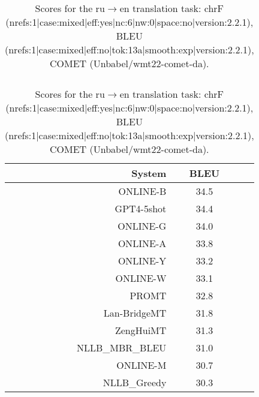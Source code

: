 \documentclass[11pt]{article}
\begin{document}
\begin{table}
\begin{subtable}[t]{0.33\textwidth}
\begin{tabular}{rcc}
\bottomrule 
\end{tabular} 
\end{subtable} 
\begin{subtable}[t]{0.33\textwidth}
\begin{tabular}{rcc}
\toprule 
System  & BLEU \\ 
\midrule 
\rowcolor{ashgrey} ONLINE-B  & 34.5 \\ 
\rowcolor{ashgrey} GPT4-5shot  & 34.4 \\ 
\rowcolor{ashgrey} ONLINE-G  & 34.0 \\ 
\rowcolor{ashgrey} ONLINE-A  & 33.8 \\ 
\rowcolor{ashgrey} ONLINE-Y  & 33.2 \\ 
\rowcolor{ashgrey} ONLINE-W  & 33.1 \\ 
\rowcolor{ashgrey} PROMT  & 32.8 \\ 
\rowcolor{ashgrey} Lan-BridgeMT  & 31.8 \\ 
\rowcolor{ashgrey} ZengHuiMT  & 31.3 \\ 
\rowcolor{ashgrey} NLLB\_MBR\_BLEU  & 31.0 \\ 
\rowcolor{ashgrey} ONLINE-M  & 30.7 \\ 
\rowcolor{ashgrey} NLLB\_Greedy  & 30.3 \\ 
\bottomrule 
\end{tabular} 
\end{subtable} 
\caption{Scores for the ru$\rightarrow$en translation task: chrF (nrefs:1|case:mixed|eff:yes|nc:6|nw:0|space:no|version:2.2.1), BLEU (nrefs:1|case:mixed|eff:no|tok:13a|smooth:exp|version:2.2.1), COMET (Unbabel/wmt22-comet-da).} 
\end{table} 
\end{document}
